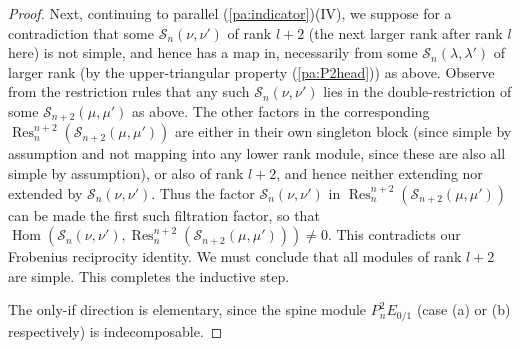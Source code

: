\documentclass[reqno,10pt,a4paper]{amsart}
\DeclareMathOperator{\Hom}{Hom}
\DeclareMathOperator{\Res}{Res}
\newcommand{\red}[1]{\textcolor{red}{#1}}
\newcommand{\ppm}[1]{\red{#1}}
\newcommand{\ppmm}[1]{{#1}}
\newcommand{\cell}{\mathcal{S}}
\newcommand{\SSS}{\mathcal{S}} %
\begin{document}
\begin{proof}
{\ppmm{ 
Next, continuing to parallel (\ref{pa:indicator})(IV), we 
suppose for a contradiction that some $\SSS_n(\nu,\nu')$ of rank $l+2$ (the next larger rank after rank $l$ here) is not simple,
and hence has a map in, necessarily from some 
$\SSS_{n}(\lambda,\lambda')$ of larger rank (by the upper-triangular property (\ref{pa:P2head})) as above. 
Observe from the restriction rules that any such   $\SSS_n(\nu,\nu')$
lies in the double-restriction of some $ \SSS_{n+2}(\mu,\mu') $
as above.
The other factors in 
the corresponding 
$\Res^{n+2}_{n} (\SSS_{n+2}(\mu,\mu')) $ are either in their own singleton block (since simple by assumption and not mapping into any lower rank module, since these are also all simple by assumption), 
or also of rank $l+2$, and hence neither extending nor extended by  $\SSS_n(\nu,\nu')$.}
Thus 
the factor $\SSS_n(\nu,\nu') $  in 
$\Res^{n+2}_{n} (\SSS_{n+2}(\mu,\mu')) $
can be made the first such filtration factor, so that 
$\Hom(\SSS_n(\nu,\nu'), \Res^{n+2}_{n} (\SSS_{n+2}(\mu,\mu'))) 
\neq 0$. 
This contradicts 
our Frobenius reciprocity identity. 
We must conclude that all modules of rank $l+2$ are simple. This completes the inductive step. 
}

The only-if direction is elementary, since the spine module $P^2_n E_{{0/1}}$ 
(case (a) or (b) respectively)
is indecomposable.
\end{proof}
\end{document}
